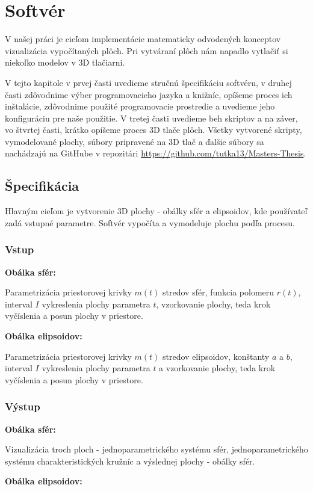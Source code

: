 \chapter{Softvér}
V našej práci je cieľom implementácie matematicky odvodených konceptov vizualizácia vypočítaných plôch. Pri vytváraní plôch nám napadlo vytlačiť si niekoľko modelov v 3D tlačiarni. 

V tejto kapitole v prvej časti uvedieme stručnú špecifikáciu softvéru, v druhej časti zdôvodnime výber programovacieho jazyka a knižníc, opíšeme proces ich inštalácie, zdôvodnime použité programovacie prostredie a uvedieme jeho konfiguráciu pre naše použitie. V tretej časti uvedieme beh skriptov a na záver, vo štvrtej časti, krátko opíšeme proces 3D tlače plôch. Všetky vytvorené skripty, vymodelované plochy, súbory pripravené na 3D tlač a ďalšie súbory sa nachádzajú na GitHube v repozitári \url{https://github.com/tutka13/Masters-Thesis}.
 
\section{Špecifikácia}
Hlavným cieľom je vytvorenie 3D plochy - obálky sfér a elipsoidov, kde používateľ zadá vstupné parametre. Softvér vypočíta a vymodeluje plochu podľa procesu.

\subsection{Vstup}
\textbf{Obálka sfér:}

Parametrizácia priestorovej krivky $m(t)$ stredov sfér, funkcia polomeru $r(t)$, interval $I$ vykreslenia plochy parametra $t$, vzorkovanie plochy, teda krok vyčíslenia a posun plochy v priestore.

\noindent \textbf{Obálka elipsoidov:}

Parametrizácia priestorovej krivky $m(t)$ stredov elipsoidov, konštanty $a$ a $b$, interval $I$ vykreslenia plochy parametra $t$ a vzorkovanie plochy, teda krok vyčíslenia a posun plochy v priestore.
\subsection{Výstup} 
\textbf{Obálka sfér:}

Vizualizácia troch ploch - jednoparametrického systému sfér, jednoparametrického systému charakteristických kružníc a výslednej plochy - obálky sfér.

\noindent \textbf{Obálka elipsoidov:}

